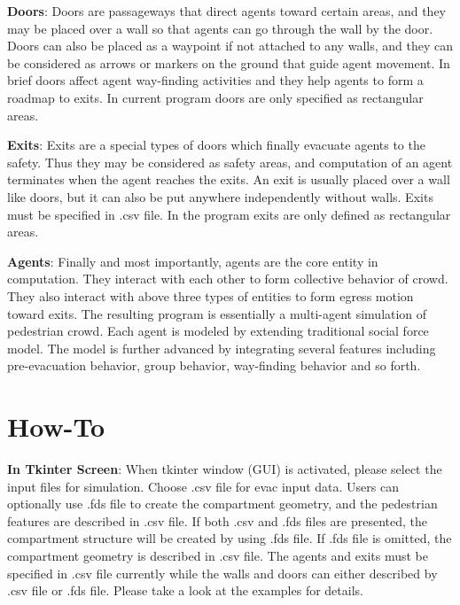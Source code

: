 \documentclass{article}
\begin{document}
\textbf{Doors}: Doors are passageways that direct agents toward certain areas, and they may be placed over a wall so that agents can go through the wall by the door.  Doors can also be placed as a waypoint if not attached to any walls, and they can be considered as arrows or markers on the ground that guide agent movement.  In brief doors affect agent way-finding activities and they help agents to form a roadmap to exits.  In current program doors are only specified as rectangular areas.

\textbf{Exits}: Exits are a special types of doors which finally evacuate agents to the safety.  Thus they may be considered as safety areas, and computation of an agent terminates when the agent reaches the exits.  An exit is usually placed over a wall like doors, but it can also be put anywhere independently without walls.  Exits must be specified in .csv file.  In the program exits are only defined as rectangular areas.

\textbf{Agents}: Finally and most importantly, agents are the core entity in computation.  They interact with each other to form collective behavior of crowd.  They also interact with above three types of entities to form egress motion toward exits.  The resulting program is essentially a multi-agent simulation of pedestrian crowd.  Each agent is modeled by extending traditional social force model.  The model is further advanced by integrating several features including pre-evacuation behavior, group behavior, way-finding behavior and so forth.


\section{How-To}

\textbf{In Tkinter Screen}: When tkinter window (GUI) is activated, please select the input files for simulation.  Choose .csv file for evac input data.  Users can optionally use .fds file to create the compartment geometry, and the pedestrian features are described in .csv file.  If both .csv and .fds files are presented, the compartment structure will be created by using .fds file.  If .fds file is omitted, the compartment geometry is described in .csv file.  The agents and exits must be specified in .csv file currently while the walls and doors can either described by .csv file or .fds file.  Please take a look at the examples for details.
\end{document}
